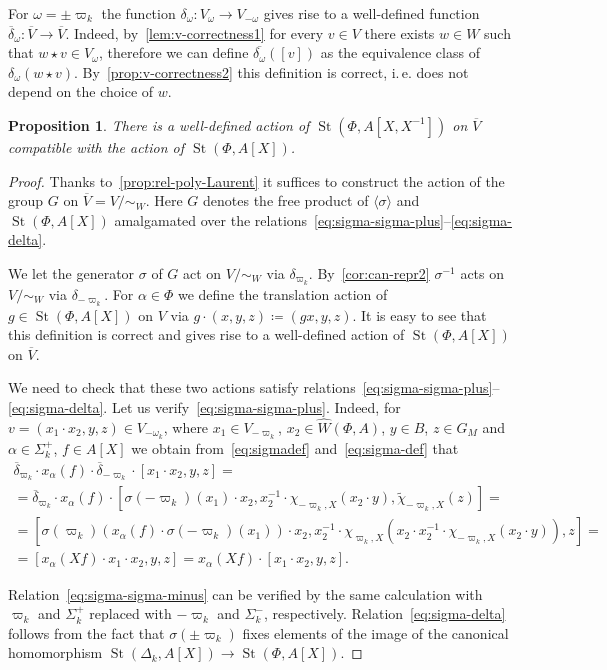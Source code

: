\documentclass[oneside, 10pt]{amsart}
\DeclareMathOperator{\St}{St}
\newcommand{\StW}{\widehat{W}}
\newcommand{\inv}{^{-1}}
\numberwithin{equation}{section}
\numberwithin{thm}{section}
\numberwithin{lemma}{section}
\newtheorem{prop}[lemma]{Proposition}
\theoremstyle{definition}
\theoremstyle{remark}
\begin{document}
For $\omega = \pm \varpi_k$ the function $\delta_\omega \colon V_{\omega} \to V_{-\omega}$ gives rise to a well-defined function $\overline{\delta}_\omega \colon \overline{V} \to \overline{V}.$
Indeed, by~\cref{lem:v-correctness1} for every $v \in V$ there exists $w \in W$ such that $w \star v \in V_\omega$, therefore
we can define $\overline{\delta_\omega}([v])$ as the equivalence class of $\delta_{\omega}(w \star v)$.
By~\cref{prop:v-correctness2} this definition is correct, i.\,e. does not depend on the choice of $w$.

\begin{prop}
There is a well-defined action of $\St(\Phi, A[X, X\inv])$ on $\overline{V}$ compatible with the action of $\St(\Phi, A[X])$.
\end{prop}
\begin{proof}
Thanks to~\cref{prop:rel-poly-Laurent} it suffices to construct the action of the group $G$ on $\overline{V} = V/\sim_W$.
Here $G$ denotes the free product of $\langle \sigma \rangle$ and $\St(\Phi, A[X])$ amalgamated over the relations~\eqref{eq:sigma-sigma-plus}--\eqref{eq:sigma-delta}.

We let the generator $\sigma$ of $G$ act on $V/\sim_W$ via $\delta_{\varpi_k}$.
By~\cref{cor:can-repr2} $\sigma^{-1}$ acts on $V/\sim_W$ via $\delta_{-\varpi_k}$.
For $\alpha \in \Phi$ we define the translation action of $g \in \St(\Phi, A[X])$ on $V$ via $g \cdot (x, y, z) \coloneqq (gx, y, z)$.
It is easy to see that this definition is correct and gives rise to a well-defined action of $\St(\Phi, A[X])$ on $\overline{V}$.

We need to check that these two actions satisfy relations~\eqref{eq:sigma-sigma-plus}--\eqref{eq:sigma-delta}.
Let us verify~\eqref{eq:sigma-sigma-plus}.
Indeed, for $v = (x_1 \cdot x_2, y, z) \in V_{-\omega_k}$, where $x_1 \in V_{-\varpi_k}$, $x_2 \in \StW(\Phi, A)$, $y \in B$, $z \in G_M$ and $\alpha \in \Sigma_k^+$, $f \in A[X]$
we obtain from~\eqref{eq:sigmadef} and~\eqref{eq:sigma-def} that
\begin{multline*}
\overline{\delta}_{\varpi_k} \cdot x_\alpha(f) \cdot \overline{\delta}_{-\varpi_k} \cdot [x_1 \cdot x_2, y, z] = \\
= \overline{\delta}_{\varpi_k} \cdot x_\alpha(f) \cdot [\sigma(-\varpi_k)(x_1) \cdot x_2, x_2^{-1} \cdot \chi_{-\varpi_k, X}(x_2 \cdot y), \widetilde{\chi}_{-\varpi_k, X}(z)] = \\
= \left[\sigma(\varpi_k)\left(x_{\alpha}(f) \cdot \sigma(-\varpi_k)(x_1)\right) \cdot x_2, x_2^{-1} \cdot \chi_{\varpi_k, X}\left(x_2 \cdot x_2^{-1} \cdot \chi_{-\varpi_k, X}(x_2 \cdot y)\right), z\right] = \\
= [x_\alpha(Xf) \cdot x_1 \cdot x_2, y, z] = x_\alpha(Xf) \cdot [x_1 \cdot x_2, y, z].
\end{multline*}

Relation~\eqref{eq:sigma-sigma-minus} can be verified by the same calculation with $\varpi_k$ and $\Sigma_k^+$ replaced with $-\varpi_k$ and $\Sigma_k^-$, respectively.
Relation~\eqref{eq:sigma-delta} follows from the fact that $\sigma(\pm \varpi_k)$ fixes elements of the image of the canonical homomorphism $\St(\Delta_k, A[X]) \to \St(\Phi, A[X])$.
\end{proof}
\end{document}
